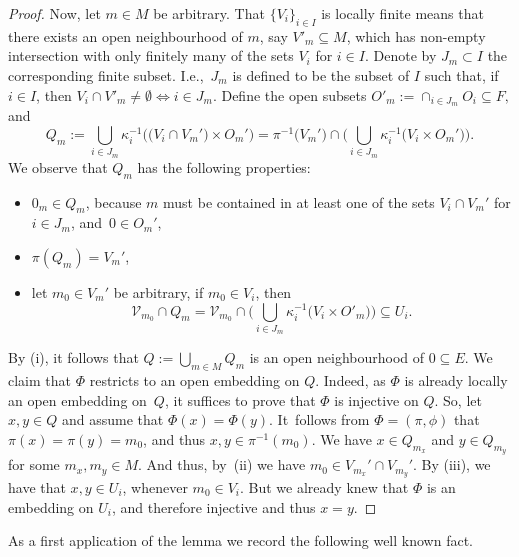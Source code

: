 \begin{proof}
Now, let $m \in M$ be arbitrary.
That $\{V_i\}_{i\in I}$ is locally finite means that there exists an open neighbourhood of $m$, say $V'_{m} \subseteq M$, which has non-empty intersection with only finitely many of the sets $V_{i}$ for $i \in I$.
Denote by $J_{m}\subset I$ the corresponding finite subset.
I.e.,~$J_{m}$ is defined to be the subset of $I$ such that, if $i \in I$, then
$V_{i} \cap V'_{m} \neq \emptyset \Longleftrightarrow i \in J_{m}.$
Define the open subsets
$
 O'_{m} := \cap_{i \in J_{m}} O_{i} \subseteq F,
 $ and
\begin{equation*}
 Q_{m} := \bigcup_{i \in J_{m}} \kappa_{i}^{-1}\bigl(\bigl(V_{i}\cap V_{m}'\bigr) \times O_{m}'\bigr) = \pi^{-1}\bigl(V_{m}'\bigr) \cap \biggl(\bigcup_{i \in J_{m}} \kappa_{i}^{-1}\bigl(V_{i} \times O_{m}'\bigr)\biggr).
\end{equation*}
We observe that $Q_{m}$ has the following properties:
\begin{itemize}\itemsep=0pt
 \item[(i)] $0_{m} \in Q_{m}$, because $m$ must be contained in at least one of the sets $V_{i} \cap V_{m}'$ for $i \in J_{m}$, and~$0 \in O_{m}'$,
 \item[(ii)] $\pi(Q_{m}) = V_{m}'$,
 \item[(iii)] let $m_{0} \in V_{m}'$ be arbitrary, if $m_{0} \in V_{i}$, then
 \begin{equation*}
 \mathcal{V}_{m_{0}} \cap Q_{m} = \mathcal{V}_{m_{0}} \cap \biggl( \bigcup_{i \in J_{m}} \kappa_{i}^{-1}\bigl(V_{i} \times O'_{m}\bigr)\biggr) \subseteq U_{i}.
 \end{equation*}
\end{itemize}
By (i), it follows that
$
 Q := \bigcup_{m \in M} Q_{m}
$ is an open neighbourhood of $0 \subseteq E$.
We claim that $\Phi$ restricts to an open embedding on $Q$.
Indeed, as $\Phi$ is already locally an open embedding on~$Q$, it suffices to prove that $\Phi$ is injective on $Q$.
So, let $x,y \in Q$ and assume that $\Phi(x) = \Phi(y)$.
It~follows from $\Phi=(\pi,\phi)$ that $\pi(x) = \pi(y) = m_{0}$, and thus $x,y \in \pi^{-1}(m_{0})$.
We have $x \in Q_{m_{x}}$ and $y \in Q_{m_{y}}$ for some $m_{x},m_{y} \in M$.
And thus, by~(ii) we have $m_{0} \in V_{m_{x}}' \cap V_{m_{y}}'$.
By (iii), we have that $x,y \in U_{i}$, whenever $m_{0} \in V_{i}$.
But we already knew that $\Phi$ is an embedding on $U_i$, and therefore injective and thus $x=y$.
\end{proof}

As a first application of the lemma we record the following well known fact.

